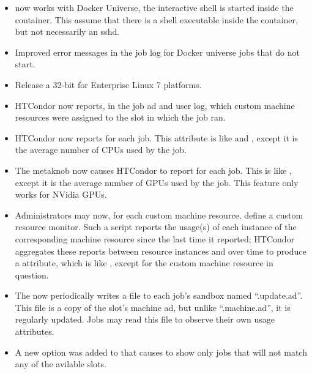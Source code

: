 \begin{itemize}

\item {} now works with Docker Universe, the interactive
shell is started inside the container.  This assume that there is a shell
executable inside the container, but not necessarily an sshd.

\item Improved error messages in the job log for Docker universe jobs
that do not start.

\item Release a 32-bit  for Enterprise Linux 7 platforms.

\item HTCondor now reports, in the job ad and user log, which custom machine
resources were assigned to the slot in which the job ran.

\item HTCondor now reports  for each job.  This attribute is
like  and , except it is the average number
of CPUs used by the job.

\item The  metaknob now causes HTCondor to report
 for each job.  This is like , except it is
the average number of GPUs used by the job.  This feature only works for
NVidia GPUs.

\item Administrators may now, for each custom machine resource, define a
custom resource monitor.  Such a script reports the usage(s) of each
instance of the corresponding machine resource since the last time it
reported; HTCondor aggregates these reports between resource instances and
over time to produce a  attribute, which is like
, except for the custom machine resource in question.

\item The  now periodically writes a file to each job's
sandbox named ``.update.ad''.  This file is a copy of the slot's machine ad,
but unlike ``.machine.ad'', it is regularly updated.  Jobs may read this
file to observe their own usage attributes.

\item A new option  was added to  that causes  to show
only jobs that will not match any of the avilable slots.


\end{itemize}
